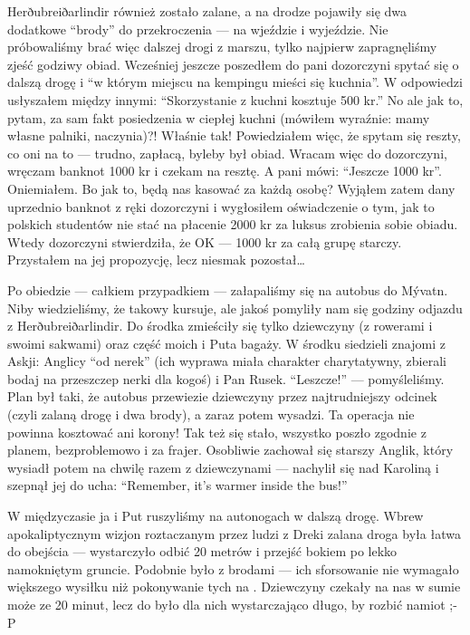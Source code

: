 Herðubreiðarlindir również zostało zalane, a na drodze pojawiły się dwa dodatkowe “brody” do przekroczenia --- na wjeździe i wyjeździe. Nie próbowaliśmy brać więc dalszej drogi z marszu, tylko najpierw zapragnęliśmy zjeść godziwy obiad. Wcześniej jeszcze poszedłem do pani dozorczyni spytać się o dalszą drogę i “w którym miejscu na kempingu mieści się kuchnia”. W odpowiedzi usłyszałem między innymi: “Skorzystanie z kuchni kosztuje 500 kr.” No ale jak to, pytam, za sam fakt posiedzenia w ciepłej kuchni (mówiłem wyraźnie: mamy własne palniki, naczynia)?! Właśnie tak! Powiedziałem więc, że spytam się reszty, co oni na to --- trudno, zapłacą, byleby był obiad. Wracam więc do dozorczyni, wręczam banknot 1000 kr i czekam na resztę. A pani mówi: “Jeszcze 1000 kr”. Oniemiałem. Bo jak to, będą nas kasować za każdą osobę? Wyjąłem zatem dany uprzednio banknot z ręki dozorczyni i wygłosiłem oświadczenie o tym, jak to polskich studentów nie stać na płacenie 2000 kr za luksus zrobienia sobie obiadu. Wtedy dozorczyni stwierdziła, że OK --- 1000 kr za całą grupę starczy. Przystałem na jej propozycję, lecz niesmak pozostał…

Po obiedzie --- całkiem przypadkiem --- załapaliśmy się na autobus do Mývatn. Niby wiedzieliśmy, że takowy kursuje, ale jakoś pomyliły nam się godziny odjazdu z Herðubreiðarlindir. Do środka zmieściły się tylko dziewczyny (z rowerami i swoimi sakwami) oraz część moich i Puta bagaży. W środku siedzieli znajomi z Askji: Anglicy “od nerek” (ich wyprawa miała charakter charytatywny, zbierali bodaj na przeszczep nerki dla kogoś) i Pan Rusek. “Leszcze!” --- pomyśleliśmy. Plan był taki, że autobus przewiezie dziewczyny przez najtrudniejszy odcinek (czyli zalaną drogę i dwa brody), a zaraz potem wysadzi. Ta operacja nie powinna kosztować ani korony! Tak też się stało, wszystko poszło zgodnie z planem, bezproblemowo i za frajer. Osobliwie zachował się starszy Anglik, który wysiadł potem na chwilę razem z dziewczynami --- nachylił się nad Karoliną i szepnął jej do ucha: “Remember, it’s warmer inside the bus!”

W międzyczasie ja i Put ruszyliśmy na autonogach w dalszą drogę. Wbrew apokaliptycznym wizjon roztaczanym przez ludzi z Dreki zalana droga była łatwa do obejścia --- wystarczyło odbić 20 metrów i przejść bokiem po lekko namokniętym gruncie. Podobnie było z brodami --- ich sforsowanie nie wymagało większego wysiłku niż pokonywanie tych na . Dziewczyny czekały na nas w sumie może ze 20 minut, lecz do było dla nich wystarczająco długo, by rozbić namiot ;-P

